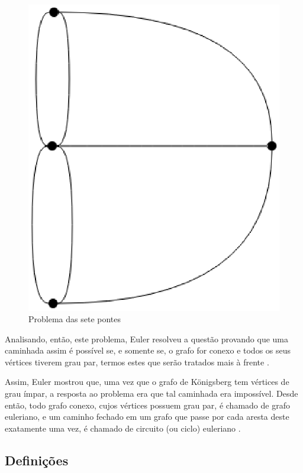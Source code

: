 \begin{figure}[!h]
	\centering
	\includegraphics[scale=0.25]{figuras/referencial_teorico/sete_pontes.eps}
	\caption[Problema das sete pontes]{Problema das sete pontes \cite{Ore:1963}}
	\label{sete_pontes}
\end{figure}

Analisando, então, este problema, Euler resolveu a questão provando que uma caminhada assim é possível se, e somente se, o grafo for conexo e todos os seus vértices tiverem grau par, termos estes que serão tratados mais à frente \cite{Malta:2008}.

Assim, Euler mostrou que, uma vez que o grafo de Königsberg tem vértices de grau ímpar, a resposta ao problema era que tal caminhada era impossível. Desde então, todo grafo conexo, cujos vértices possuem grau par, é chamado de grafo euleriano, e um caminho fechado em um grafo que passe por cada aresta deste exatamente uma vez, é chamado de circuito (ou ciclo) euleriano \cite{Malta:2008}.

\subsection{Definições}

